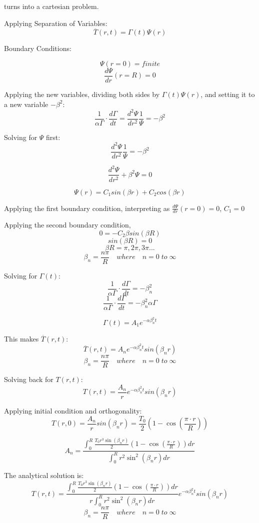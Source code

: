 \documentclass[12pt,letterpaper]{article}
\begin{document}
turns into a cartesian problem.

Applying Separation of Variables:
\[\overline{T}(r,t) = \Gamma (t) \Psi (r)  \]

Boundary Conditions:

\[\Psi(r = 0) = finite \]
\[\frac{d\Psi}{dr} (r = R) = 0 \]

Applying the new variables, dividing both sides by $\Gamma (t) \Psi (r) $,
and setting it to a new variable $ -\beta^2 $:
\[\frac{1}{\alpha  \Gamma} \cdot \frac{d\Gamma}{dt} = \frac{d^2 \Psi}{dr^2} \frac{1}{\Psi} = -\beta^2 \] 

Solving for $\Psi$ first:
\[\frac{d^2 \Psi}{dr^2} \frac{1}{\Psi} = -\beta^2 \]

\[\frac{d^2 \Psi}{dr^2} + \beta^2 \Psi = 0 \]

\[\Psi (r) = C_1 sin(\beta r) + C_2 cos(\beta r) \]

Applying the first boundary condition,
interpreting as $\frac{d\Psi}{dr} (r = 0) = 0$, $C_1 = 0 $

Applying the second boundary condition,
\[0 =  -C_2 \beta sin(\beta R) \]
\[sin(\beta R) = 0  \]
\[\beta R = \pi, 2\pi, 3\pi ... \]
\[\beta_n = \frac{n\pi}{R} \quad where \quad n = 0 \; to \; \infty \]

Solving for $\Gamma(t)$:
\[\frac{1}{\alpha  \Gamma} \cdot \frac{d\Gamma}{dt} = -\beta_n^2 \]
\[\frac{1}{\alpha  \Gamma} \cdot \frac{d\Gamma}{dt} = -\beta_n^2 \alpha \Gamma \]

\[\Gamma(t) = A_1 e^{-\alpha \beta_n^2 t }\]

This makes $\overline{T}(r,t)$:
\[\overline{T}(r,t) = A_n e^{-\alpha \beta_n^2 t} sin(\beta_n r)\]
\[\beta_n = \frac{n\pi}{R} \quad where \quad n = 0 \; to \; \infty \]

Solving back for $T(r,t)$:
\[T(r,t) = \frac{A_n}{r} e^{-\alpha \beta_n^2 t} sin(\beta_n r)\]

Applying initial condition and orthogonality:
\[T(r,0) = \frac{A_n}{r} sin(\beta_n r) = \frac{T_0}{2} (1-\cos{(\frac{\pi \cdot r}{R})}) \]

\[A_n = \frac{\int_{0}^{R} \frac{T_0 r^3 \sin(\beta_n r)}{2} (1-\cos{(\frac{\pi \cdot r}{R})}) dr}{\int_{0}^{R} r^2 \sin^{2}(\beta_n r) dr}\]

The analytical solution is:
\[T(r,t) = \frac{\int_{0}^{R} \frac{T_0 r^3 \sin(\beta_n r)}{2} (1-\cos{(\frac{\pi \cdot r}{R})}) dr}{r \int_{0}^{R} r^2 \sin^{2}(\beta_n r) dr} e^{-\alpha \beta_n^2 t} sin(\beta_n r)\]
\[\beta_n = \frac{n\pi}{R} \quad where \quad n = 0 \; to \; \infty \]
\end{document}
